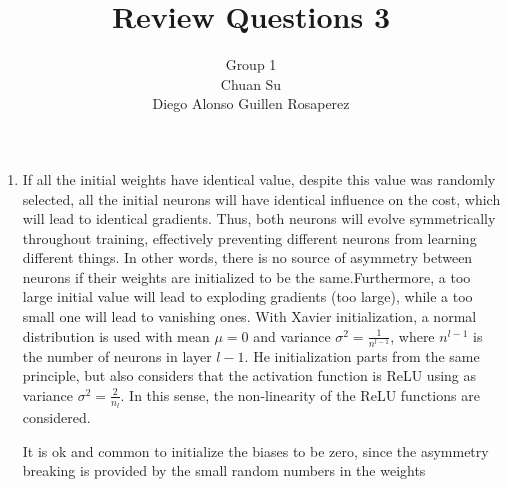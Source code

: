 \documentclass[12pt]{article}
\begin{document}
\title{Review Questions 3}
\author{Group 1 \\ Chuan Su \\ Diego Alonso Guillen Rosaperez}

\maketitle
\begin{enumerate}
\item If all the initial weights have identical value, despite this value was randomly selected, all the initial neurons will have identical influence on the cost, which will lead to identical gradients. Thus, both neurons will evolve symmetrically throughout training, effectively preventing different neurons from learning different things. In other words, there is no source of asymmetry between neurons if their weights are initialized to be the same.Furthermore, a too large initial value will lead to exploding gradients (too large), while a too small one will lead to vanishing ones. With Xavier initialization, a normal distribution is used with mean $\mu = 0$ and variance $\sigma^2 = \frac{1}{n^{l-1}}$, where $n^{l-1}$ is the number of neurons in layer $l-1$. He initialization parts from the same principle, but also considers that the activation function is ReLU using as variance $\sigma^2 = \frac{2}{n_{l}}$. In this sense, the non-linearity of the ReLU functions are considered.

It is ok and common to initialize the biases to be zero, since the asymmetry breaking is provided by the small random numbers in the weights


\end{enumerate}
\end{document}
